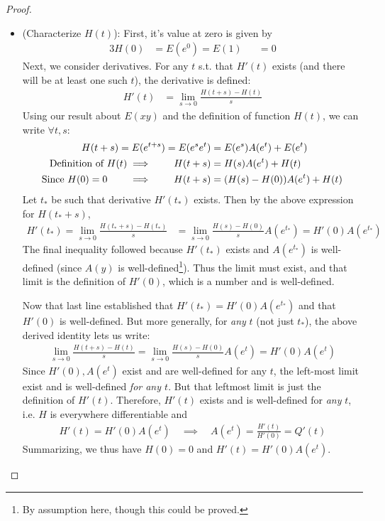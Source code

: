 \documentclass[12pt]{article}
\theoremstyle{plain}
\theoremstyle{definition}
\theoremstyle{remark}
\newcommand{\ra}{\rightarrow}
\begin{document}
\begin{proof}
\begin{itemize}
  \clearpage
  \item (Characterize $H(t)$):
    First, it's value at zero is given by
    \begin{alignat*}{3}
      H(0)
      &= E(e^{0})=E(1) &&= 0
    \end{alignat*}
    Next, we consider derivatives.
    For any $t$ s.t. that $H'(t)$ exists (and there will be at least
    one such $t$), the derivative is defined:
    \begin{align*}
      H'(t)
      &=\lim_{s\ra 0} \frac{H(t+s)-H(t)}{s}
    \end{align*}
    Using our result about $E(xy)$ and the definition of function
    $H(t)$, we can write $\forall t,s$:
    \begin{align}
      H(t+s)
      = E(e^{t+s})
      = E(e^{s}e^t)
      &=
      E(e^s)
      A(e^t)
      +
      E(e^t)
      \notag
      \\
      \text{Definition of $H(t)$}
      \implies\qquad
      H(t+s)
      &=
      H(s)A(e^t)+H(t)
      \label{H(t+s)}
      \\
      \text{Since $H(0)=0$}\qquad
      \implies\qquad
      H(t+s)
      &=
      (H(s)-H(0))A(e^t)+H(t)
    \end{align}
    Let $t_*$ be such that derivative $H'(t_*)$ exists.
    Then by the above expression for $H(t_*+s)$,
    \begin{align*}
      H'(t_*)
      =
      \lim_{s\ra 0}
      \frac{H(t_*+s)-H(t_*)}{s}
      &=
      \lim_{s\ra 0}
      \frac{H(s)-H(0)}{s}A(e^{t_*})
      =
      H'(0)A(e^{t_*})
    \end{align*}
    The final inequality followed because $H'(t_*)$ exists and
    $A(e^{t_*})$ is well-defined (since $A(y)$ is
    well-defined\footnote{%
      By assumption here, though this could be proved.
    }).
    Thus the limit must exist, and that limit is the definition of
    $H'(0)$, which is a number and is well-defined.

    Now that last line established that $H'(t_*)=H'(0)A(e^{t_*})$ and
    that $H'(0)$ is well-defined. But more generally, for \emph{any}
    $t$ (not just $t_*$), the above derived identity lets us write:
    \begin{align*}
      \lim_{s\ra 0}
      \frac{H(t+s)-H(t)}{s}
      =
      \lim_{s\ra 0}
      \frac{H(s)-H(0)}{s}A(e^{t})
      =
      H'(0)A(e^{t})
    \end{align*}
    Since $H'(0),A(e^t)$ exist and are well-defined for any $t$,
    the left-most limit exist and is well-defined \emph{for any $t$}.
    But that leftmost limit is just the definition
    of $H'(t)$. Therefore, $H'(t)$ exists and is well-defined for
    \emph{any} $t$, i.e. $H$ is everywhere differentiable and
    \begin{align}
      H'(t)=H'(0)A(e^t)
      \quad\implies\quad
      A(e^t) = \frac{H'(t)}{H'(0)}
      = Q'(t)
      \label{HQ}
    \end{align}
    Summarizing, we thus have $H(0)=0$ and $H'(t)=H'(0)A(e^t)$.


\end{itemize}
\end{proof}
\end{document}
